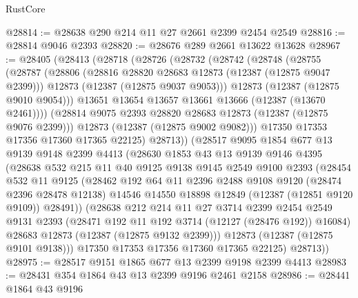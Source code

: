 \begin{lexlean}{RustCore}
\begin{coremodule}
@28814 := @28638 @290 @214 @11 @27 @2661 @2399 @2454 @2549
@28816 := @28814 @9046 @2393
@28820 := @28676 @289 @2661 @13622 @13628
@28967 := @28405
    (@28413
      (@28718
        (@28726
          (@28732
            (@28742
              (@28748
                (@28755
                  (@28787
                    (@28806
                      (@28816 @28820 @28683 @12873 (@12387 (@12875 @9047 @2399)))
                      @12873
                      (@12387 (@12875 @9037 @9053)))
                    @12873
                    (@12387 (@12875 @9010 @9054)))
                  @13651
                  @13654
                  @13657
                  @13661
                  @13666
                  (@12387 (@13670 @2461))))
              (@28814 @9075 @2393 @28820 @28683 @12873 (@12387 (@12875 @9076 @2399)))
              @12873
              (@12387 (@12875 @9002 @9082)))
            @17350
            @17353
            @17356
            @17360
            @17365
            @22125)
          @28713))
      (@28517
        @9095
        @1854
        @677
        @13
        @9139
        @9148
        @2399
        @4413
        (@28630
          @1853
          @43
          @13
          @9139
          @9146
          @4395
          (@28638
            @532
            @215
            @11
            @40
            @9125
            @9138
            @9145
            @2549
            @9100
            @2393
            (@28454
              @532
              @11
              @9125
              (@28462
                @192
                @64
                @11
                @2396
                @2488
                @9108
                @9120
                (@28474 @2396 @28478 @12138)
                @14546
                @14550
                @18898
                @12849
                (@12387 (@12851 @9120 @9109))
                @28491))
            (@28638
              @212
              @214
              @11
              @27
              @3714
              @2399
              @2454
              @2549
              @9131
              @2393
              (@28471 @192 @11 @192 @3714 (@12127 (@28476 @192)) @16084)
              @28683
              @12873
              (@12387 (@12875 @9132 @2399)))
            @12873
            (@12387 (@12875 @9101 @9138)))
          @17350
          @17353
          @17356
          @17360
          @17365
          @22125)
        @28713))
@28975 := @28517 @9151 @1865 @677 @13 @2399 @9198 @2399 @4413
@28983 := @28431 @354 @1864 @43 @13 @2399 @9196 @2461 @2158
@28986 := @28441 @1864 @43 @9196

\end{coremodule}
\end{lexlean}
